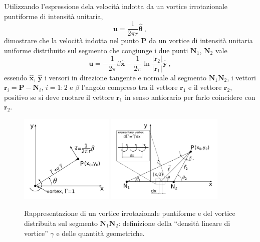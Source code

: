 \begin{exerciseS}
 Utilizzando l'espressione dela velocità indotta da un vortice irrotazionale puntiforme di intensità unitaria,
\begin{equation}
 \bm{u} = \dfrac{1}{2\pi r} \bm{\hat{\theta}} \ ,
\end{equation}
 dimostrare che la velocità indotta nel punto $\bm{P}$ da un vortice di intensità unitaria uniforme distribuito sul segmento che congiunge i due punti $\bm{N}_1$, $\bm{N}_2$ vale
\begin{equation}
 \bm{u} = - \dfrac{1}{2\pi} \beta \bm{\hat{x}} 
 - \dfrac{1}{2\pi} \ln \dfrac{|\bm{r}_2|}{|\bm{r}_1|} \bm{\hat{y}} \ ,
\end{equation}
 essendo $\bm{\hat{x}}$, $\bm{\hat{y}}$ i versori in direzione tangente e normale al segmento $\bm{N}_1 \bm{N}_2$, i vettori $\bm{r}_i = \bm{P} - \bm{N}_i$, $i = 1:2$ e $\beta$ l'angolo compreso tra il vettore $\bm{r}_1$ e il vettore $\bm{r}_2$, positivo se si deve ruotare il vettore $\bm{r}_1$ in senso antiorario per farlo coincidere con $\bm{r}_2$.
\end{exerciseS}

\begin{center}
\begin{figure}[h]
\centering
\includegraphics[width=0.40\textwidth]{./fig/pointVortex}
\includegraphics[width=0.50\textwidth]{./fig/lineVortex}
\caption{Rappresentazione di un vortice irrotazionale puntiforme e del vortice distribuita sul segmento $\bm{N}_1 \bm{N}_2$: definizione della ``densità lineare di vortice'' $\gamma$ e delle quantità geometriche.}\label{fig:lineVortex}
\end{figure}
\end{center}

